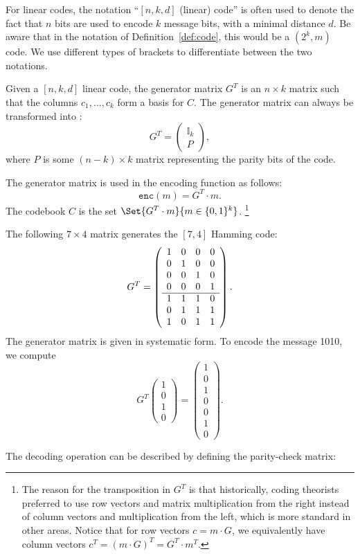 For linear codes, the notation ``$[n,k,d]$ (linear) code'' is often used to denote the fact that $n$ bits are used to encode $k$ message bits, with a minimal distance $d$. Be aware that in the notation of Definition~\ref{def:code}, this would be a $(2^k, m)$ code. We use different types of brackets to differentiate between the two notations.

\begin{definition}
Given a $[n,k,d]$ linear code, the generator matrix $G^T$ is an $n \times k$ matrix such that the columns $c_1, \ldots, c_k$ form a basis for $C$. The generator matrix can always be transformed into :
\[
G^T = 
\left(
\begin{array}{c}
\mathbb{I}_k\\
\hline
P
\end{array}
\right),
\]
where $P$ is some $(n-k) \times k$ matrix representing the parity bits of the code.
\end{definition}
The generator matrix is used in the encoding function as follows:
\[
\mathtt{enc}(m) = G^T \cdot m.
\]
The codebook $C$ is the set $\Set{G^T \cdot m}{m \in \{0,1\}^k}$.
\footnote{The reason for the transposition in $G^T$ is that historically, coding theorists preferred to use row vectors and matrix multiplication from the right instead of column vectors and multiplication from the left, which is more standard in other areas. Notice that for row vectors $c = m \cdot G$, we equivalently have column vectors $c^T = (m \cdot G)^T = G^T \cdot m^T$.}

\begin{example}
The following $7 \times 4$ matrix generates the $[7,4]$ Hamming code:
\[
G^T = 
\left(
\begin{array}{c c c c}
1 & 0 & 0 & 0\\
0 & 1 & 0 & 0\\
0 & 0 & 1 & 0\\
0 & 0 & 0 & 1\\
\hline
1 & 1 & 1 & 0\\
0 & 1 & 1 & 1\\
1 & 0 & 1 & 1
\end{array}
\right).
\]
The generator matrix is given in systematic form. To encode the message 1010, we compute
\[
G^T \left(\begin{array}{c}
1\\0\\1\\0
\end{array}\right) = \left(\begin{array}{c}
1\\0\\1\\0\\0\\1\\0
\end{array}\right).
\]
\end{example}
The decoding operation can be described by defining the parity-check matrix:

